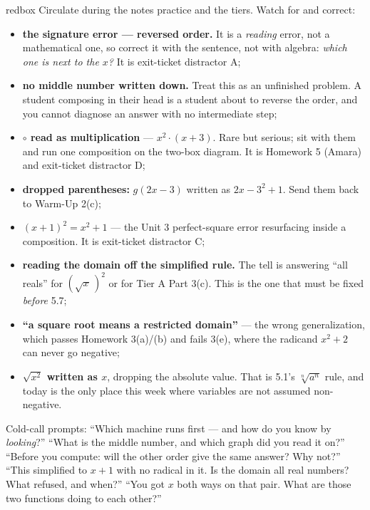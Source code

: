 \documentclass[10pt]{article}
\begin{document}
\begin{skillbox}{redbox}
Circulate during the notes practice and the tiers. Watch for and correct:
\begin{itemize}[leftmargin=1.2em, nosep]
  \item \textbf{the signature error --- reversed order.} It is a \emph{reading} error, not a mathematical one, so correct it with the sentence, not with algebra: \emph{which one is next to the $x$?} It is exit-ticket distractor A;
  \item \textbf{no middle number written down.} Treat this as an unfinished problem. A student composing in their head is a student about to reverse the order, and you cannot diagnose an answer with no intermediate step;
  \item \textbf{$\circ$ read as multiplication} --- $x^{2}\cdot(x+3)$. Rare but serious; sit with them and run one composition on the two-box diagram. It is Homework 5 (Amara) and exit-ticket distractor D;
  \item \textbf{dropped parentheses:} $g(2x-3)$ written as $2x-3^{2}+1$. Send them back to Warm-Up 2(c);
  \item \textbf{$(x+1)^{2}=x^{2}+1$} --- the Unit 3 perfect-square error resurfacing inside a composition. It is exit-ticket distractor C;
  \item \textbf{reading the domain off the simplified rule.} The tell is answering ``all reals'' for $\left(\sqrt{x}\,\right)^{2}$ or for Tier A Part 3(c). This is the one that must be fixed \emph{before} 5.7;
  \item \textbf{``a square root means a restricted domain''} --- the wrong generalization, which passes Homework 3(a)/(b) and fails 3(e), where the radicand $x^{2}+2$ can never go negative;
  \item \textbf{$\sqrt{x^{2}}$ written as $x$}, dropping the absolute value. That is 5.1's $\sqrt[n]{a^{n}}$ rule, and today is the only place this week where variables are not assumed non-negative.
\end{itemize}
Cold-call prompts: ``Which machine runs first --- and how do you know by \emph{looking}?'' ``What is
the middle number, and which graph did you read it on?'' ``Before you compute: will the other order
give the same answer? Why not?'' ``This simplified to $x+1$ with no radical in it. Is the domain all
real numbers? What refused, and when?'' ``You got $x$ both ways on that pair. What are those two
functions doing to each other?''
\end{skillbox}
\end{document}
